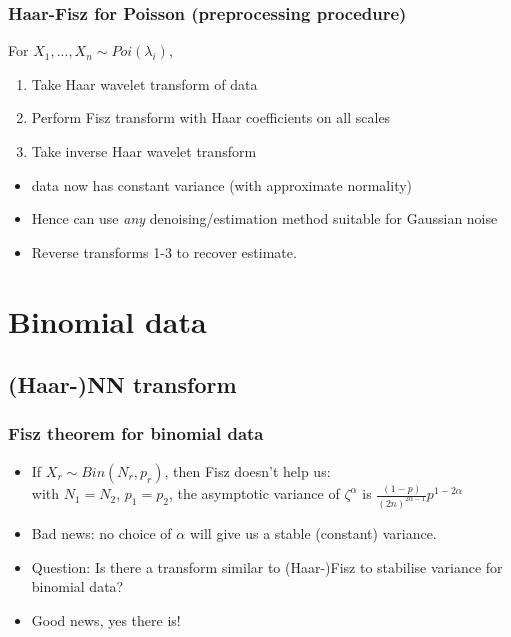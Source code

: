 \documentclass{beamer}
\def\la{\lambda}
\begin{document}
\begin{frame}
\frametitle{Haar-Fisz for Poisson (preprocessing procedure)} For
$X_1,...,X_n\sim Poi(\la_i)$,
\begin{enumerate}
\item Take Haar wavelet transform of data\pause
\item Perform Fisz transform with Haar coefficients on all scales \pause
\item Take inverse Haar wavelet transform \pause
\end{enumerate}

\begin{itemize}
\item data now has constant variance (with approximate normality) \pause
\vspace{.3cm}
\item Hence can use {\emph{any}} denoising/estimation method suitable for
Gaussian noise\pause \vspace{.3cm}
\item Reverse transforms 1-3 to recover estimate.
\end{itemize}
\end{frame}

\section{Binomial data}
\subsection{(Haar-)NN transform}
\begin{frame}
\frametitle{Fisz theorem for binomial data}
\begin{itemize}
\item If $X_r\sim Bin(N_r,p_r)$, then Fisz doesn't help us:\\ \pause
\vspace{.2cm}
with $N_1=N_2$, $p_1=p_2$, the asymptotic variance of
$\zeta^\alpha$ is $\frac{(1-p)}{(2n)^{2\alpha-1}}p^{1-2\alpha}$
  \pause
  \vspace{.2cm}
  \item Bad news: no choice of $\alpha$ will give us a stable (constant)
  variance.\pause
  \vspace{.2cm}
\item Question: Is there a transform similar to (Haar-)Fisz to stabilise variance for binomial data? \pause
\vspace{.5cm}
\item Good news, yes there is!
\end{itemize}
\end{frame}
\end{document}

